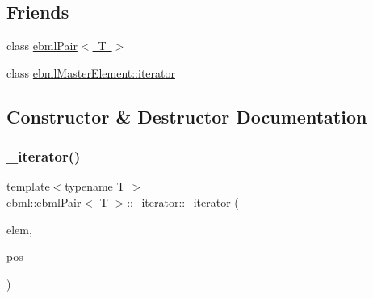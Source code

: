\subsection*{Friends}
\begin{DoxyCompactItemize}
\item 
class \mbox{\hyperlink{classebml_1_1ebmlPair_1_1__iterator_ad1db4b5395f31070d1be2d251ee85e02}{ebml\+Pair$<$ T $>$}}
\item 
class \mbox{\hyperlink{classebml_1_1ebmlPair_1_1__iterator_a7f678a46134f738b99dfff4aafa7fc5f}{ebml\+Master\+Element\+::iterator}}
\end{DoxyCompactItemize}


\subsection{Constructor \& Destructor Documentation}
\mbox{\label{classebml_1_1ebmlPair_1_1__iterator_a857b4dbf1193d6f844780fd2a8a72f73}} 
\subsubsection{\texorpdfstring{\+\_\+iterator()}{\_iterator()}\hspace{0.1cm}{\footnotesize\ttfamily [1/3]}}
{\footnotesize\ttfamily template$<$typename T $>$ \\
\mbox{\hyperlink{classebml_1_1ebmlPair}{ebml\+::ebml\+Pair}}$<$ T $>$\+::\+\_\+iterator\+::\+\_\+iterator (\begin{DoxyParamCaption}\item[{const \mbox{\hyperlink{namespaceebml_a15439f6031c0f4ced33b9ab5e28af120}{ebml\+Pair\+\_\+sp}}$<$ T $>$ \&}]{elem,  }\item[{unsigned char}]{pos }\end{DoxyParamCaption})\hspace{0.3cm}{\ttfamily [protected]}}

\mbox{\label{classebml_1_1ebmlPair_1_1__iterator_ae46c70f189bfe5ebb7859ce3175488bd}} 
